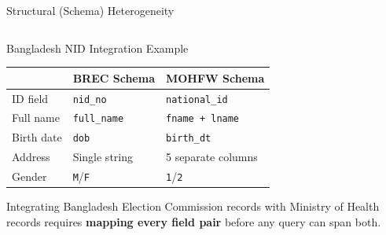 \documentclass[aspectratio=169,10pt]{beamer}
\begin{document}
\begin{frame}{Structural (Schema) Heterogeneity}
\begin{columns}[T]
      \begin{block}{Bangladesh NID Integration Example}
        \small
        \renewcommand{\arraystretch}{1.2}
        \begin{tabular}{lll}
          \toprule
          & \textbf{BREC Schema} & \textbf{MOHFW Schema} \\
          \midrule
          ID field   & \texttt{nid\_no}     & \texttt{national\_id} \\
          Full name  & \texttt{full\_name}  & \texttt{fname + lname} \\
          Birth date & \texttt{dob}         & \texttt{birth\_dt} \\
          Address    & Single string         & 5 separate columns \\
          Gender     & \texttt{M}/\texttt{F} & \texttt{1}/\texttt{2} \\
          \bottomrule
        \end{tabular}
        \vspace{4pt}
        Integrating Bangladesh Election Commission records with Ministry of Health records requires \textbf{mapping every field pair} before any query can span both.
      \end{block}
  \end{columns}
\end{frame}
\end{document}

